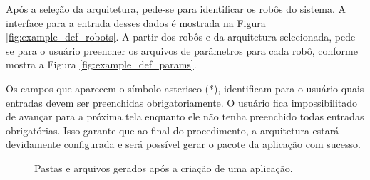             Após a seleção da arquitetura, pede-se para identificar os robôs do sistema. A interface para a entrada desses dados é mostrada na Figura \ref{fig:example_def_robots}. A partir dos robôs e da arquitetura selecionada, pede-se para o usuário preencher os arquivos de parâmetros para cada robô, conforme mostra a Figura \ref{fig:example_def_params}.
            
            Os campos que aparecem o símbolo asterisco (*), identificam para o usuário quais entradas devem ser preenchidas obrigatoriamente. O usuário fica impossibilitado de avançar para a próxima tela enquanto ele não tenha preenchido todas entradas obrigatórias. Isso garante que ao final do procedimento, a arquitetura estará devidamente configurada e será possível gerar o pacote da aplicação com sucesso.
            
            \begin{figure}[htb]
                \centering
                
                \caption{Pastas e arquivos gerados após a criação de uma aplicação.} \label{fig:example}
            \end{figure}
            
